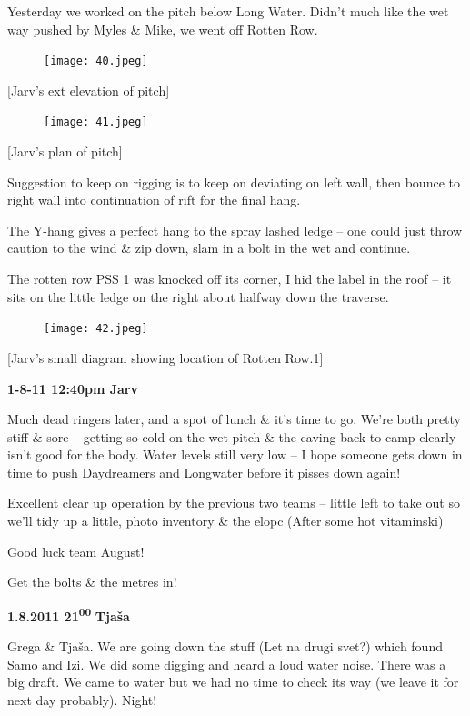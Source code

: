 Yesterday we worked on the pitch below Long Water. Didn't much like the
wet way pushed by Myles \& Mike, we went off Rotten Row.

\begin{figure}[htbp]
\centering
\texttt{[image: 40.jpeg]}
\caption{}
\end{figure}

{[}Jarv's ext elevation of pitch{]}

\begin{figure}[htbp]
\centering
\texttt{[image: 41.jpeg]}
\caption{}
\end{figure}

{[}Jarv's plan of pitch{]}

Suggestion to keep on rigging is to keep on deviating on left wall, then
bounce to right wall into continuation of rift for the final hang.

The Y-hang gives a perfect hang to the spray lashed ledge -- one could
just throw caution to the wind \& zip down, slam in a bolt in the wet
and continue.

The rotten row PSS 1 was knocked off its corner, I hid the label in the
roof -- it sits on the little ledge on the right about halfway down the
traverse.

\begin{figure}[htbp]
\centering
\texttt{[image: 42.jpeg]}
\caption{}
\end{figure}

{[}Jarv's small diagram showing location of Rotten Row.1{]}

\textbf{1-8-11 12:40pm Jarv}

Much dead ringers later, and a spot of lunch \& it's time to go. We're
both pretty stiff \& sore -- getting so cold on the wet pitch \& the
caving back to camp clearly isn't good for the body. Water levels still
very low -- I hope someone gets down in time to push Daydreamers and
Longwater before it pisses down again!

Excellent clear up operation by the previous two teams -- little left to
take out so we'll tidy up a little, photo inventory \& the elopc (After
some hot vitaminski)

Good luck team August!

Get the bolts \& the metres in!

\textbf{1.8.2011 21\textsuperscript{00}} \textbf{Tjaša}

Grega \& Tjaša. We are going down the stuff (Let na drugi svet?) which
found Samo and Izi. We did some digging and heard a loud water noise.
There was a big draft. We came to water but we had no time to check its
way (we leave it for next day probably). Night!

